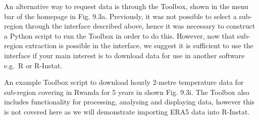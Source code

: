\documentclass[
  letterpaper,
  DIV=11,
  numbers=noendperiod]{scrreprt}
\begin{document}
An alternative way to request data is through the Toolbox, shown in the
menu bar of the homepage in Fig. 9.3a. Previously, it was not possible
to select a sub-region through the interface described above, hence it
was necessary to construct a Python script to run the Toolbox in order
to do this. However, now that sub-region extraction is possible in the
interface, we suggest it is sufficient to use the interface if your main
interest is to download data for use in another software e.g.~R or
R-Instat.

An example Toolbox script to download hourly 2-metre temperature data
for sub-region covering in Rwanda for 5 years in shown Fig. 9.3i. The
Toolbox also includes functionality for processing, analysing and
displaying data, however this is not covered here as we will demonstrate
importing ERA5 data into R-Instat.
\end{document}
